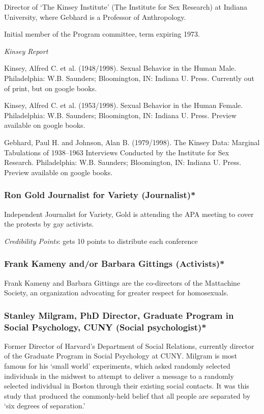 Director of `The Kinsey Institute' (The Institute for Sex Research) at Indiana University, where Gebhard is a Professor of Anthropology. 

Initial member of the Program committee, term expiring 1973.

\emph{Kinsey Report}

Kinsey, Alfred C. et al. (1948\slash 1998). Sexual Behavior in the Human Male. Philadelphia: W.B. Saunders; Bloomington, IN: Indiana U. Press. Currently out of print, but on google books.

Kinsey, Alfred C. et al. (1953\slash 1998). Sexual Behavior in the Human Female. Philadelphia: W.B. Saunders; Bloomington, IN: Indiana U. Press. Preview available on google books.

Gebhard, Paul H. and Johnson, Alan B. (1979\slash 1998). The Kinsey Data: Marginal Tabulations of 1938--1963 Interviews Conducted by the Institute for Sex Research. Philadelphia: W.B. Saunders; Bloomington, IN: Indiana U. Press. Preview available on google books.

\subsubsection{Ron Gold Journalist for Variety (Journalist)*}
\label{rongoldjournalistforvarietyjournalist}

Independent Journalist for Variety, Gold is attending the APA meeting to cover the protests by gay activists.

\emph{Credibility Points}: gets 10 points to distribute each conference

\subsubsection{Frank Kameny and\slash or Barbara Gittings (Activists)*}
\label{frankkamenyandorbarbaragittingsactivists}

Frank Kameny and Barbara Gittings are the co-directors of the Mattachine Society, an organization advocating for greater respect for homosexuals.

\subsubsection{Stanley Milgram, PhD Director, Graduate Program in Social Psychology, CUNY (Social psychologist)*}
\label{stanleymilgramphddirectorgraduateprograminsocialpsychologycunysocialpsychologist}

Former Director of Harvard's Department of Social Relations, currently director of the Graduate Program in Social Psychology at CUNY. Milgram is most famous for his `small world' experiments, which asked randomly selected individuals in the midwest to attempt to deliver a message to a randomly selected individual in Boston through their existing social contacts. It was this study that produced the commonly-held belief that all people are separated by `six degrees of separation.'

